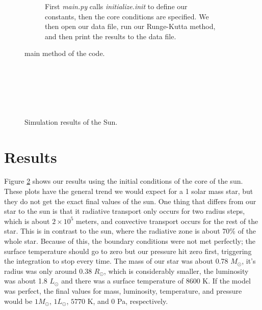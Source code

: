 \documentclass[10pt]{article}
\begin{document}
\begin{figure}[htbp]

 \begin{subfigure}{\textwidth}
  
  
  
  
  \caption{First \emph{main.py} calls \emph{initialize.init} to define our constants, then the core conditions are specified. We then open our data file, run our Runge-Kutta method, and then print the results to the data file.}
 \end{subfigure}
 \caption{main method of the code.}
 \label{fig:code}
\end{figure}

\begin{figure}[p]
\begin{centering}
 \begin{subfigure}{\textwidth}
  
 \end{subfigure} \\
 \begin{subfigure}{\textwidth}
  
 \end{subfigure} \\
  \begin{subfigure}{\textwidth}
  
 \end{subfigure} \\
   \begin{subfigure}{\textwidth}
  
 \end{subfigure}
 \caption{Simulation results of the Sun.}
 \label{fig:sun}
 \end{centering}
\end{figure}

\section{Results}
Figure \ref{fig:sun} shows our results using the initial conditions of the core of the sun. These plots have the general trend we would expect for a 1 solar mass star, but they do not get the exact final values of the sun. One thing that differs from our star to the sun is that it radiative transport only occurs for two radius steps, which is about $2\times 10^5$ meters, and convective transport occurs for the rest of the star. This is in contrast to the sun, where the radiative zone is about 70\% of the whole star. Because of this, the boundary conditions were not met perfectly; the surface temperature should go to zero but our pressure hit zero first, triggering the integration to stop every time. The mass of our star was about 0.78 $M_\odot$, it's radius was only around 0.38 $R_\odot$, which is considerably smaller, the luminosity was about 1.8 $ L_\odot$ and there was a surface temperature of 8600 K. If the model was perfect, the final values for mass, luminosity, temperature, and pressure would be $1 M_\odot$, $1 L_\odot$, $5770$ K, and $0$ Pa, respectively. \\
\end{document}

